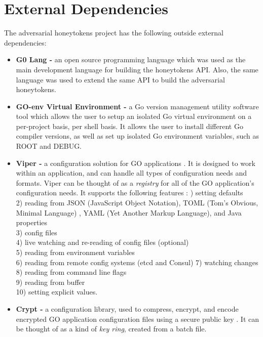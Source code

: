 \documentclass[grad,lot,lof,11pt,oneside,onehalfspace]{RUthesis}
\begin{document}
\section{External Dependencies}
The adversarial honeytokens project has the following outside external dependencies:
\begin{itemize}
	\item \textbf{G0 Lang -} an open source programming language \cite{robert_griesemer_go:_2018} which was used as the main development language for building the honeytokens API. Also, the same language was used to extend the same API to build the adversarial honeytokens. 
	\item\textbf{GO-env Virtual Environment -} a Go version management  utility software tool \cite{smith_goenv:_2018} which allows the user to setup an isolated Go virtual environment on a per-project basis, per shell basis. It allows the user to install different Go compiler versions, as well as set up isolated Go environment variables, such as ROOT and DEBUG.
	\item \textbf{Viper -} a configuration solution for GO applications \cite{francia_viper:_2018}. It is designed to work within an application, and can handle all types of configuration needs and formats. Viper can be thought of as a \textit{registry} for all of the GO application's configuration needs. It supports the following features \cite{francia_viper:_2018}:
	) setting defaults\\
	2) reading from JSON (JavaScript Object Notation), TOML (Tom's Obvious, Minimal Language) , YAML (Yet Another Markup Language), and Java properties\\
	3) config files\\
	4) live watching and re-reading of config files (optional)\\
	5) reading from environment variables\\
	6) reading from remote config systems (etcd and Consul)
	7) watching changes\\
	8) reading from command line flags\\
	9) reading from buffer\\
	10) setting explicit values.
	\item \textbf{Crypt -} a configuration library, used to compress, encrypt, and encode encrypted GO application configuration files using a secure public key \cite{xor_data_exchange_crypt_2018}. It can be thought of as a kind of \textit{key ring}, created from a batch file.

\end{itemize}
\end{document}

